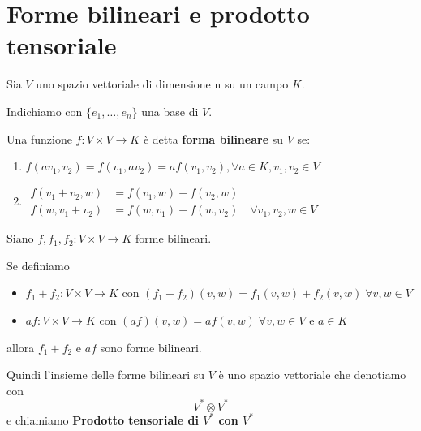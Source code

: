 \documentclass[../main.tex]{subfiles}
\begin{document}
\section{Forme bilineari e prodotto tensoriale}
\begin{definition}
    Sia $V$ uno spazio vettoriale  di dimensione n su un campo $K$.

    Indichiamo con $\{e_1, \ldots , e_n\}$ una base di $V$.

    Una funzione $f : V \times V \rightarrow K$ è detta \textbf{forma bilineare} su $V$ se:
    \begin{enumerate}
        \item $f(a v_1, v_2) = f(v_1, a v_2) = a f(v_1,v_2), \forall a \in K, v_1, v_2 \in V$
        \item $\begin{aligned}
                      f(v_1 + v_2, w) & = f(v_1, w) + f(v_2, w)                                 \\
                      f(w, v_1 + v_2) & = f(w, v_1) + f(w, v_2) \quad \forall v_1, v_2, w \in V
                  \end{aligned}$
    \end{enumerate}
\end{definition}

\begin{definition}
    Siano $f, f_1, f_2 : V \times V \rightarrow K$ forme bilineari.

    Se definiamo
    \begin{itemize}
        \item $f_1 + f_2 : V \times V \rightarrow K$ con $(f_1 + f_2)(v, w) = f_1(v, w) + f_2(v, w) \; \forall v,w \in V$
        \item $a f : V \times V \rightarrow K$ con $(a f)(v, w) = a f(v, w) \; \forall v,w \in V$ e $a \in K$
    \end{itemize}
    allora $f_1 + f_2$ e $a f$ sono forme bilineari.

    Quindi l'insieme delle forme bilineari su $V$ è uno spazio vettoriale che denotiamo con
    \begin{equation*}
        V^* \otimes V^*
    \end{equation*}
    e chiamiamo \textbf{Prodotto tensoriale di $V^*$ con $V^*$}
\end{definition}
\end{document}

